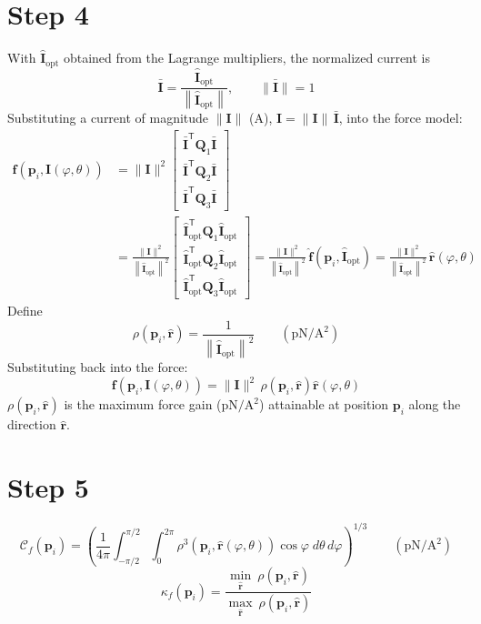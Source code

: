 \documentclass[11pt]{article}
\newcommand{\rh}{\hat{\mathbf{r}}}
\begin{document}
\section*{Step 4}

With $\hat{\mathbf{I}}_{\mathrm{opt}}$ obtained from the Lagrange multipliers, the normalized current is
\[
\bar{\mathbf{I}}=\frac{\hat{\mathbf{I}}_{\mathrm{opt}}}{\left\|\hat{\mathbf{I}}_{\mathrm{opt}}\right\|},\qquad
\|\bar{\mathbf{I}}\|=1
\]
Substituting a current of magnitude $\|\mathbf{I}\|$ (A), $\mathbf{I}=\|\mathbf{I}\|\,\bar{\mathbf{I}}$, into the force model:
\[
\begin{aligned}
\mathbf{f}\!\left(\mathbf{p}_i,\mathbf{I}(\varphi,\theta)\right)
&=\|\mathbf{I}\|^2
\begin{bmatrix}
\bar{\mathbf{I}}^{\mathsf T}\mathbf{Q}_1\bar{\mathbf{I}}\\[2pt]
\bar{\mathbf{I}}^{\mathsf T}\mathbf{Q}_2\bar{\mathbf{I}}\\[2pt]
\bar{\mathbf{I}}^{\mathsf T}\mathbf{Q}_3\bar{\mathbf{I}}
\end{bmatrix}\\[6pt]
&=\frac{\|\mathbf{I}\|^2}{\left\|\hat{\mathbf{I}}_{\mathrm{opt}}\right\|^2}
\begin{bmatrix}
\hat{\mathbf{I}}_{\mathrm{opt}}^{\mathsf T}\mathbf{Q}_1\hat{\mathbf{I}}_{\mathrm{opt}}\\[2pt]
\hat{\mathbf{I}}_{\mathrm{opt}}^{\mathsf T}\mathbf{Q}_2\hat{\mathbf{I}}_{\mathrm{opt}}\\[2pt]
\hat{\mathbf{I}}_{\mathrm{opt}}^{\mathsf T}\mathbf{Q}_3\hat{\mathbf{I}}_{\mathrm{opt}}
\end{bmatrix}
=\frac{\|\mathbf{I}\|^2}{\left\|\hat{\mathbf{I}}_{\mathrm{opt}}\right\|^2}\,\hat{\mathbf{f}}\!\left(\mathbf{p}_i,\hat{\mathbf{I}}_{\mathrm{opt}}\right)
=\frac{\|\mathbf{I}\|^2}{\left\|\hat{\mathbf{I}}_{\mathrm{opt}}\right\|^2}\,\rh(\varphi,\theta)
\end{aligned}
\]
Define
\[
\rho\!\left(\mathbf{p}_i,\rh\right)=\frac{1}{\left\|\hat{\mathbf{I}}_{\mathrm{opt}}\right\|^2}
\qquad(\mathrm{pN/A^2})
\]
Substituting back into the force:
\[
\mathbf{f}\!\left(\mathbf{p}_i,\mathbf{I}(\varphi,\theta)\right)=\|\mathbf{I}\|^2\,\rho\!\left(\mathbf{p}_i,\rh\right)\rh(\varphi,\theta)
\]
$\rho(\mathbf{p}_i,\rh)$ is the maximum force gain ($\mathrm{pN/A^2}$) attainable at position $\mathbf{p}_i$ along the direction $\rh$.

\section*{Step 5}

\[
\mathcal{C}_f(\mathbf{p}_i)
=\left(\frac{1}{4\pi}\int_{-\pi/2}^{\pi/2}\int_{0}^{2\pi}\rho^3\!\left(\mathbf{p}_i,\rh(\varphi,\theta)\right)\cos\varphi\;d\theta\,d\varphi\right)^{1/3}
\qquad(\mathrm{pN/A^2})
\]
\[
\kappa_f(\mathbf{p}_i)
=\frac{\displaystyle\min_{\rh}\ \rho\!\left(\mathbf{p}_i,\rh\right)}{\displaystyle\max_{\rh}\ \rho\!\left(\mathbf{p}_i,\rh\right)}
\]
\end{document}
